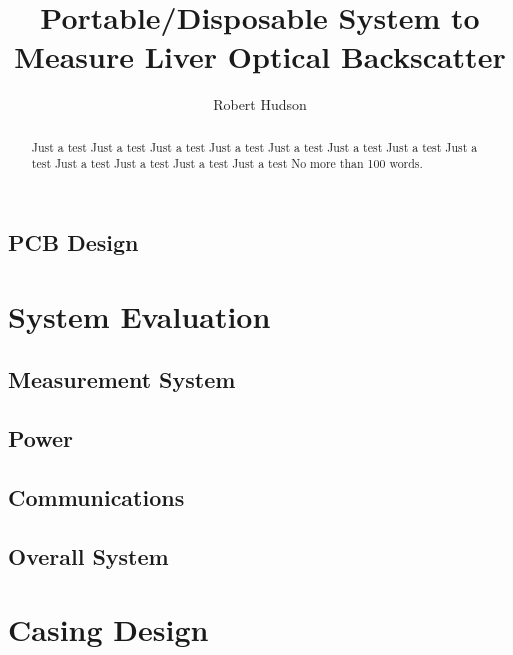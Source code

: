 \documentclass{IIBproject}
\begin{document}
\author{Robert Hudson}
\title{Portable/Disposable System to Measure Liver Optical Backscatter}
\maketitle
\thispagestyle{empty}


\begin{abstract}
Just a test Just a test Just a test Just a test Just a test Just a test 
Just a test Just a test Just a test Just a test Just a test Just a test 
No more than 100 words.
\end{abstract}

\newpage
\tableofcontents
\newpage
\pagestyle{plain}














\subsection{PCB Design}





\section{System Evaluation}
\subsection{Measurement System}
\subsection{Power}
\subsection{Communications}
\subsection{Overall System}


\section{Casing Design}
\end{document}
